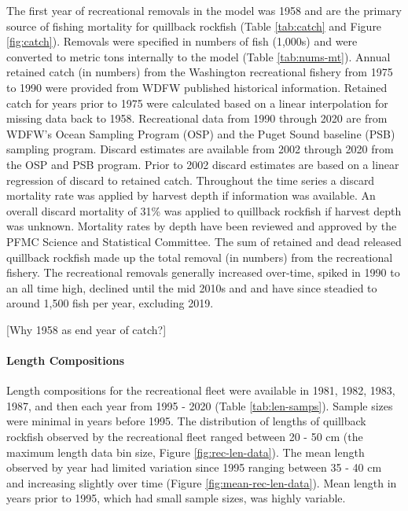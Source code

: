 \documentclass[11pt,
  english,
  a4paper,
]{article}
\begin{document}
The first year of recreational removals in the model was 1958 and are the primary source of fishing mortality for quillback rockfish (Table \ref{tab:catch} and Figure \ref{fig:catch}). Removals were specified in numbers of fish (1,000s) and were converted to metric tons internally to the model (Table \ref{tab:nums-mt}). Annual retained catch (in numbers) from the Washington recreational fishery from 1975 to 1990 were provided from WDFW published historical information. Retained catch for years prior to 1975 were calculated based on a linear interpolation for missing data back to 1958. Recreational data from 1990 through 2020 are from WDFW's Ocean Sampling Program (OSP) and the Puget Sound baseline (PSB) sampling program. Discard estimates are available from 2002 through 2020 from the OSP and PSB program. Prior to 2002 discard estimates are based on a linear regression of discard to retained catch. Throughout the time series a discard mortality rate was applied by harvest depth if information was available. An overall discard mortality of 31\% was applied to quillback rockfish if harvest depth was unknown. Mortality rates by depth have been reviewed and approved by the PFMC Science and Statistical Committee. The sum of retained and dead released quillback rockfish made up the total removal (in numbers) from the recreational fishery. The recreational removals generally increased over-time, spiked in 1990 to an all time high, declined until the mid 2010s and and have since steadied to around 1,500 fish per year, excluding 2019.

\leavevmode\tagmcend\tagstructend\par


{[}Why 1958 as end year of catch?{]}

\leavevmode\tagmcend\tagstructend\par


\hypertarget{length-compositions-1}{%
\paragraph{Length Compositions}\label{length-compositions-1}}

\leavevmode\tagmcend\tagstructend


Length compositions for the recreational fleet were available in 1981, 1982, 1983, 1987, and then each year from 1995 - 2020 (Table \ref{tab:len-samps}). Sample sizes were minimal in years before 1995. The distribution of lengths of quillback rockfish observed by the recreational fleet ranged between 20 - 50 cm (the maximum length data bin size, Figure \ref{fig:rec-len-data}). The mean length observed by year had limited variation since 1995 ranging between 35 - 40 cm and increasing slightly over time (Figure \ref{fig:mean-rec-len-data}). Mean length in years prior to 1995, which had small sample sizes, was highly variable.
\end{document}
